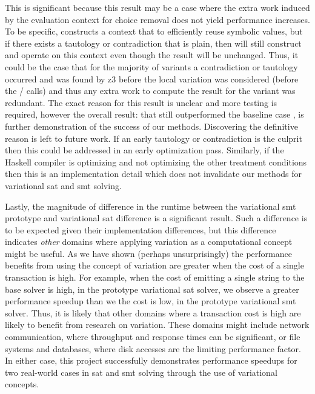 This is significant because this result may be a case where the extra work
induced by the evaluation context for choice removal does not yield performance
increases. To be specific, \vTov{} constructs a context that to efficiently
reuse symbolic values, but if there exists a tautology or contradiction that is
plain, then \vTov{} will still construct and operate on this context even though
the result will be unchanged. Thus, it could be the case that for the majority
of variants a contradiction or tautology occurred and was found by z3 before the
local variation was considered (before the / calls) and thus
any extra work to compute the result for the variant was redundant. The exact
reason for this result is unclear and more testing is required, however the
overall result: that \vTov{} still outperformed the baseline case \vTop{}, is
further demonstration of the success of our methods. Discovering the definitive
reason is left to future work. If an early tautology or contradiction is the
culprit then this could be addressed in an early optimization pass. Similarly,
if the Haskell compiler is optimizing \pTov{} and not optimizing the other
treatment conditions then this is an implementation detail which does not
invalidate our methods for variational \ac{sat} and \ac{smt} solving.

Lastly, the magnitude of difference in the runtime between the variational
\ac{smt} prototype and variational \ac{sat} difference is a significant result.
Such a difference is to be expected given their implementation differences, but
this difference indicates \emph{other} domains where applying variation as a
computational concept might be useful. As we have shown (perhaps unsurprisingly)
the performance benefits from using the concept of variation are greater when
the cost of a single transaction is high. For example, when the cost of emitting
a single string to the base solver is high, \eg{} in the prototype variational
\ac{sat} solver, we observe a greater performance speedup than we the cost is
low, \eg{} in the prototype variational \ac{smt} solver. Thus, it is likely that
other domains where a transaction cost is high are likely to benefit from
research on variation. These domains might include network communication, where
throughput and response times can be significant, or file systems and databases,
where disk accesses are the limiting performance factor. In either case, this
project successfully demonstrates performance speedups for two real-world cases
in \ac{sat} and \ac{smt} solving through the use of variational concepts.
